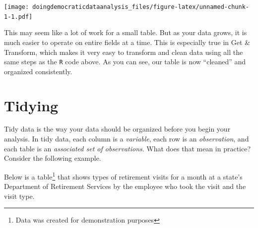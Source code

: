 \documentclass[
]{book}
\newenvironment{Shaded}{\begin{snugshade}}{\end{snugshade}}
\newcommand{\CommentTok}[1]{\textcolor[rgb]{0.56,0.35,0.01}{\textit{#1}}}
\newcommand{\DataTypeTok}[1]{\textcolor[rgb]{0.13,0.29,0.53}{#1}}
\newcommand{\KeywordTok}[1]{\textcolor[rgb]{0.13,0.29,0.53}{\textbf{#1}}}
\newcommand{\NormalTok}[1]{#1}
\newcommand{\OperatorTok}[1]{\textcolor[rgb]{0.81,0.36,0.00}{\textbf{#1}}}
\newcommand{\OtherTok}[1]{\textcolor[rgb]{0.56,0.35,0.01}{#1}}
\newcommand{\StringTok}[1]{\textcolor[rgb]{0.31,0.60,0.02}{#1}}
\begin{document}
\begin{Shaded}
\begin{Highlighting}[]
{{{{{\CommentTok{#print to datatable}
\NormalTok{sites_cleaned}\OperatorTok{%
    \DataTypeTok{extensions =} \StringTok{'Buttons'}\NormalTok{, }
    \DataTypeTok{options =} \KeywordTok{list}\NormalTok{(}\DataTypeTok{dom =} \StringTok{'Bfrtip'}\NormalTok{, }
                   \DataTypeTok{buttons =} \StringTok{'excel'}\NormalTok{,}
                   \DataTypeTok{searching =} \OtherTok{FALSE}\NormalTok{))}
\end{Highlighting}
\end{Shaded}

\texttt{[image: doingdemocraticdataanalysis\_files/figure-latex/unnamed-chunk-1-1.pdf]}

This may seem like a lot of work for a small table. But as your data grows, it is much easier to operate on entire fields at a time. This is especially true in Get \& Transform, which makes it very easy to transform and clean data using all the same steps as the \texttt{R} code above. As you can see, our table is now ``cleaned'' and organized consistently.

\hypertarget{tidying}{%
\section{Tidying}\label{tidying}}

Tidy data is the way your data should be organized before you begin your analysis. In tidy data, each column is a \emph{variable}, each row is an \emph{observation}, and each table is an \emph{associated set of observations}. What does that mean in practice? Consider the following example.

Below is a table\footnote{Data was created for demonstration purposes} that shows types of retirement visits for a month at a state's Department of Retirement Services by the employee who took the visit and the visit type.
\end{document}
